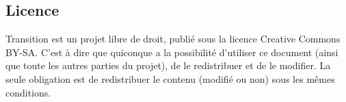 \documentclass{book}
\begin{document}
\subsection{Licence}
Transition est un projet libre de droit, publié sous la licence Creative Commons BY-SA. C'est à dire que quiconque a la possibilité d'utiliser ce document (ainsi que toute les autres parties du projet), de le redistribuer et de le modifier. La seule obligation est de redistribuer le contenu (modifié ou non) sous les mêmes conditions.
\end{document}
